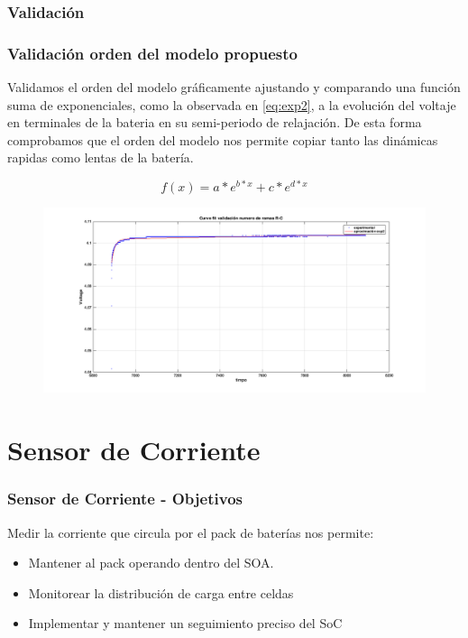 \documentclass[10pt]{beamer}
\theoremstyle{remark}
\theoremstyle{definition}
\begin{document}
\subsubsection{Validación}
\begin{frame}
\frametitle{Validación orden del modelo propuesto}

Validamos el orden del modelo gráficamente ajustando y comparando una función suma de exponenciales, como la observada en \ref{eq:exp2}, a la evolución del voltaje en terminales de la bateria en su semi-periodo de relajación. De esta forma comprobamos que el orden del modelo nos permite copiar tanto las dinámicas rapidas como lentas de la batería. 

\begin{equation}
f(x) = a*e^{b*x} + c*e^{d*x}
\label{eq:exp2}
\end{equation}

\begin{figure}
	\centering
\includegraphics[width=0.9\linewidth]{images/exp_ord_2_val.png}

\caption{}
\label{fig:val_exp2}

\end{figure}

\end{frame}



\section{Sensor de Corriente}

\begin{frame}[allowframebreaks]
	\frametitle{Sensor de Corriente - Objetivos}
	Medir la corriente que circula por el pack de baterías nos permite:
	\begin{itemize}
	  \item Mantener al pack operando dentro del SOA.
	  \item Monitorear la distribución de carga entre celdas
	  \item Implementar y mantener un seguimiento preciso del SoC
	\end{itemize}
\end{frame}
\end{document}
